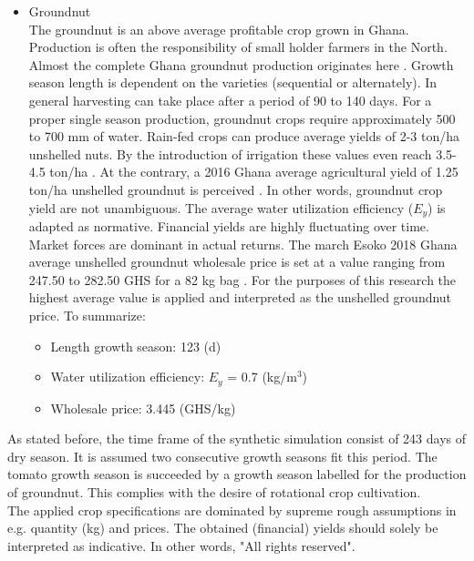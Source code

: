\begin{itemize}
\item{Groundnut} \\
The groundnut is an above average profitable crop grown in Ghana. Production is often the responsibility of small holder farmers in the North. Almost the complete Ghana groundnut production originates here \citep{Ghana-made2018}. Growth season length is dependent on the varieties (sequential or alternately). In general harvesting can take place after a period of 90 to 140 days. For a proper single season production, groundnut crops require approximately 500 to 700 mm of water. Rain-fed crops can produce average yields of 2-3 ton/ha unshelled nuts. By the introduction of irrigation these values even reach 3.5-4.5 ton/ha \citep{FoodandAgriculturalOrganisationoftheUnitedNationsFAO2018a}.  At the contrary, a 2016 Ghana average agricultural yield of 1.25 ton/ha unshelled groundnut is perceived \citep{FoodandAgriculturalOrganisationoftheUnitedNationsFAO2018}. 
In other words, groundnut crop yield are not unambiguous. The \citet{FoodandAgriculturalOrganisationoftheUnitedNationsFAO2018a} average water utilization efficiency ($E_y$) is adapted as normative. Financial yields are highly fluctuating over time. Market forces are dominant in actual returns. The march Esoko 2018 Ghana average unshelled groundnut wholesale price is set at a value ranging from 247.50 to 282.50 GHS for a 82 kg bag \citep{ModernGhana2018}. For the purposes of this research the highest average value is applied and interpreted as the unshelled groundnut price. To summarize:
\begin{itemize}
\item{Length growth season: 123 (d)}
\item{Water utilization efficiency: $E_y$ = 0.7 (kg/m$^3$)}
\item{Wholesale price: 3.445 (GHS/kg)}
\end{itemize} 
\end{itemize}

As stated before, the time frame of the synthetic simulation consist of 243 days of dry season. It is assumed two consecutive growth seasons fit this period. The tomato growth season is succeeded by a growth season labelled for the production of groundnut. This complies with the desire of rotational crop cultivation. \\

The applied crop specifications are dominated by supreme rough assumptions in e.g. quantity (kg) and prices. The obtained (financial) yields should solely be interpreted as indicative. In other words, "All rights reserved". \\
 
